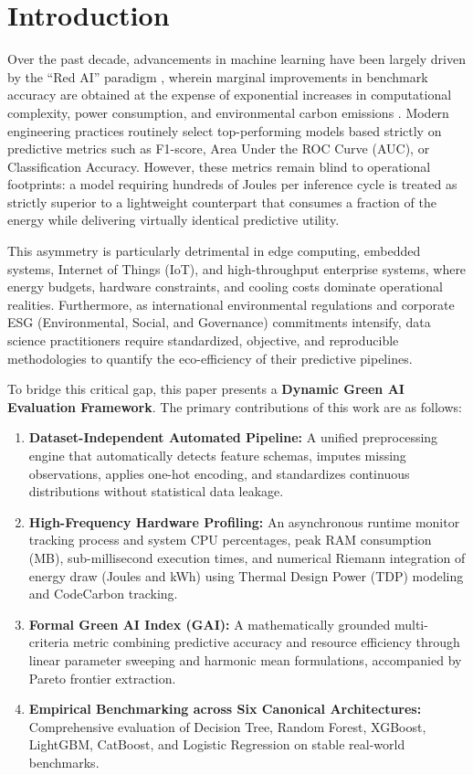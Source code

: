 \documentclass[conference]{IEEEtran}
\begin{document}
\section{Introduction}
Over the past decade, advancements in machine learning have been largely driven by the ``Red AI'' paradigm \cite{schwartz2020green}, wherein marginal improvements in benchmark accuracy are obtained at the expense of exponential increases in computational complexity, power consumption, and environmental carbon emissions \cite{strubell2019energy, henderson2020towards}. Modern engineering practices routinely select top-performing models based strictly on predictive metrics such as F1-score, Area Under the ROC Curve (AUC), or Classification Accuracy. However, these metrics remain blind to operational footprints: a model requiring hundreds of Joules per inference cycle is treated as strictly superior to a lightweight counterpart that consumes a fraction of the energy while delivering virtually identical predictive utility.

This asymmetry is particularly detrimental in edge computing, embedded systems, Internet of Things (IoT), and high-throughput enterprise systems, where energy budgets, hardware constraints, and cooling costs dominate operational realities. Furthermore, as international environmental regulations and corporate ESG (Environmental, Social, and Governance) commitments intensify, data science practitioners require standardized, objective, and reproducible methodologies to quantify the eco-efficiency of their predictive pipelines.

To bridge this critical gap, this paper presents a \textbf{Dynamic Green AI Evaluation Framework}. The primary contributions of this work are as follows:
\begin{enumerate}
    \item \textbf{Dataset-Independent Automated Pipeline:} A unified preprocessing engine that automatically detects feature schemas, imputes missing observations, applies one-hot encoding, and standardizes continuous distributions without statistical data leakage.
    \item \textbf{High-Frequency Hardware Profiling:} An asynchronous runtime monitor tracking process and system CPU percentages, peak RAM consumption (MB), sub-millisecond execution times, and numerical Riemann integration of energy draw (Joules and kWh) using Thermal Design Power (TDP) modeling and CodeCarbon tracking.
    \item \textbf{Formal Green AI Index (GAI):} A mathematically grounded multi-criteria metric combining predictive accuracy and resource efficiency through linear parameter sweeping and harmonic mean formulations, accompanied by Pareto frontier extraction.
    \item \textbf{Empirical Benchmarking across Six Canonical Architectures:} Comprehensive evaluation of Decision Tree, Random Forest, XGBoost, LightGBM, CatBoost, and Logistic Regression on stable real-world benchmarks.
\end{enumerate}
\end{document}
